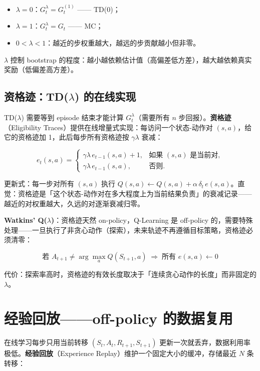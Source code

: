 \documentclass{article}
\begin{document}
\begin{itemize}
  \item $\lambda=0$：$G_t^\lambda = G_t^{(1)}$ —— TD(0)；
  \item $\lambda=1$：$G_t^\lambda = G_t$ —— MC；
  \item $0<\lambda<1$：越近的步权重越大，越远的步贡献越小但非零。
\end{itemize}

$\lambda$ 控制 bootstrap 的程度：越小越依赖估计值（高偏差低方差），越大越依赖真实奖励（低偏差高方差）。

\subsection*{资格迹：TD($\lambda$) 的在线实现}

TD($\lambda$) 需要等到 episode 结束才能计算 $G_t^\lambda$（需要所有 $n$ 步回报）。\textbf{资格迹}（Eligibility Traces）提供在线增量式实现：每访问一个状态-动作对 $(s,a)$，给它的资格迹加 1，此后每步所有资格迹按 $\gamma\lambda$ 衰减：

\[
e_t(s,a) = \begin{cases}
  \gamma\lambda\, e_{t-1}(s,a) + 1, & \text{如果 } (s,a) \text{ 是当前对}, \\
  \gamma\lambda\, e_{t-1}(s,a),      & \text{否则}.
\end{cases}
\]

更新式：每一步对所有 $(s,a)$ 执行 $Q(s,a) \leftarrow Q(s,a) + \alpha\,\delta_t\, e(s,a)$。直觉：资格迹是「这个状态-动作对在多大程度上为当前结果负责」的衰减记录——越近的对权重越大，久远的对逐渐衰减归零。

\textbf{Watkins' Q($\lambda$)}：资格迹天然 on-policy，Q-Learning 是 off-policy 的，需要特殊处理——一旦执行了非贪心动作（探索），未来轨迹不再遵循目标策略，资格迹必须清零：

\[
\text{若 } A_{t+1} \neq \arg\max_a Q(S_{t+1},a) \;\Longrightarrow\; \text{所有 } e(s,a) \leftarrow 0
\]

代价：探索率高时，资格迹的有效长度取决于「连续贪心动作的长度」而非固定的 $\lambda$。

\section*{经验回放——off-policy 的数据复用}

在线学习每步只用当前转移 $(S_t,A_t,R_{t+1},S_{t+1})$ 更新一次就丢弃，数据利用率极低。\textbf{经验回放}（Experience Replay）维护一个固定大小的缓冲，存储最近 $N$ 条转移：
\end{document}
